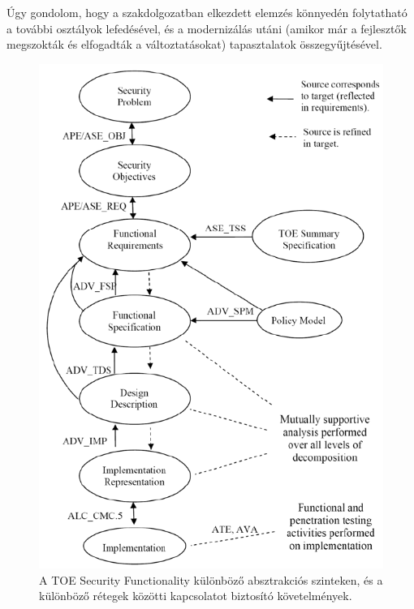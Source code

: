 Úgy gondolom, hogy a szakdolgozatban elkezdett elemzés könnyedén folytatható a további osztályok
lefedésével, és a modernizálás utáni (amikor már a fejlesztők megszokták és elfogadták
a változtatásokat) tapasztalatok összegyűjtésével.
\begin{figure}[h]
    \centering
    \includegraphics[keepaspectratio]{figures/layers.png}
    \caption{A TOE Security Functionality különböző absztrakciós szinteken, és a különböző rétegek
    közötti kapcsolatot biztosító követelmények.}
    \label{fig:layers}
\end{figure}
